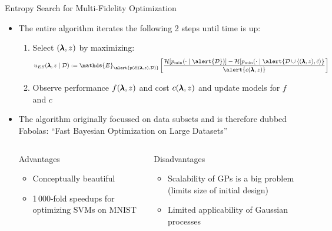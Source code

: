 \begin{frame}[c]{Entropy Search for Multi-Fidelity Optimization }

\begin{itemize}
    \item The entire algorithm iterates the following 2 steps until time is up:
		\begin{enumerate}
			\item Select $(\pmb{\lambda},z)$ by maximizing:
    			\[{\acq}_{ES}(\conf,z \mid \dataset) := \mathds{E}_{\alert{p(\tilde{\cost}\mid (\conf, z), \dataset)}} 
            	\left[   \frac{\mathcal{H}[p_{\text{min}}(\cdot \mid \alert{\dataset})] - \mathcal{H}[p_{\text{min}}(\cdot \mid \alert{\dataset \cup \left\langle (\conf,z), \tilde{\cost} \right\rangle}}{\alert{c(\conf,z)}} \right]\]
			\item Observe performance $f(\pmb{\lambda},z)$ and cost $c(\pmb{\lambda},z)$ and update models for $f$ and $c$ 
		\end{enumerate}

\pause

    \item The algorithm originally focussed on data subsets and is therefore dubbed \\ \alert{Fabolas}: 
    ``Fast Bayesian Optimization on Large Datasets''
	
\pause

\begin{columns}[T] %
\begin{column}{.48\textwidth}


    \begin{block}{Advantages}
    \begin{itemize}
    	\item Conceptually beautiful
    	\item 1\,000-fold speedups for optimizing SVMs on MNIST
    \end{itemize}
    \end{block}
\pause
\end{column}%

\hfill%

\begin{column}{.48\textwidth}

    \begin{block}{Disadvantages}
    \begin{itemize}
    	\item \alert{Scalability} of GPs is a big problem (limits size of initial design)
    	\item Limited applicability of Gaussian processes
    \end{itemize}
\end{block}

\end{column}
\end{columns}   

\end{itemize}
\end{frame}

